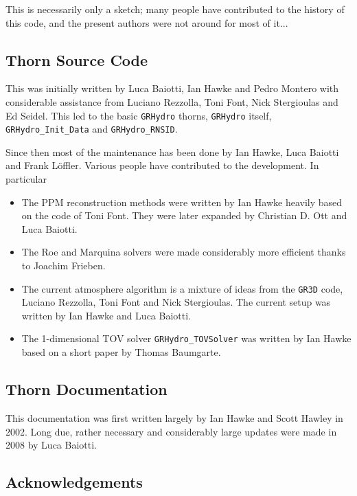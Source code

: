 \documentclass{article}
\begin{document}
This is necessarily only a sketch; many people have contributed to
the history of this code, and the present authors were not around for most of it...

\subsection{Thorn Source Code}

This was initially written by Luca Baiotti, Ian Hawke and Pedro
Montero with considerable assistance from Luciano Rezzolla, Toni Font,
Nick Stergioulas and Ed Seidel. This led to the basic {\tt GRHydro} thorns,
{\tt GRHydro} itself, {\tt GRHydro\_Init\_Data} and {\tt GRHydro\_RNSID}.

Since then most of the maintenance has been done by Ian Hawke, Luca Baiotti and Frank L\"offler. Various
people have contributed to the development. In particular
\begin{itemize}
\item The PPM reconstruction methods were written by Ian Hawke heavily
  based on the code of Toni Font. They were later expanded by Christian D. Ott and Luca Baiotti.
\item The Roe and Marquina solvers were made considerably more
  efficient thanks to Joachim Frieben.
\item The current atmosphere algorithm is a mixture of ideas from the
  {\tt GR3D} code, Luciano Rezzolla, Toni Font and Nick
  Stergioulas. The current setup was written by Ian Hawke and Luca Baiotti.
\item The 1-dimensional TOV solver {\tt GRHydro\_TOVSolver} was written
  by Ian Hawke based on a short paper by Thomas Baumgarte.
\end{itemize}

\subsection{Thorn Documentation}

This documentation was first written largely by Ian Hawke and Scott Hawley in 2002. Long due,
rather necessary and considerably large updates were made in 2008 by Luca Baiotti.


\subsection{Acknowledgements}
\end{document}
